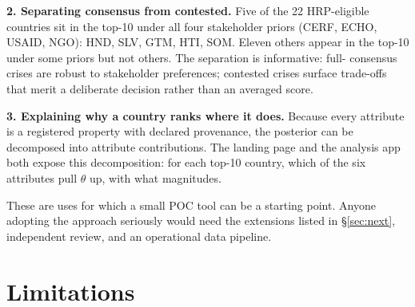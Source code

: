 \documentclass[11pt,a4paper]{article}
\begin{document}
\textbf{2. Separating consensus from contested.} Five of the 22 HRP-eligible
countries sit in the top-10 under all four stakeholder priors (CERF, ECHO,
USAID, NGO): HND, SLV, GTM, HTI, SOM. Eleven others appear in the top-10
under some priors but not others. The separation is informative: full-
consensus crises are robust to stakeholder preferences; contested crises
surface trade-offs that merit a deliberate decision rather than an averaged
score.

\textbf{3. Explaining why a country ranks where it does.} Because every
attribute is a registered property with declared provenance, the posterior
can be decomposed into attribute contributions. The landing page and the
analysis app both expose this decomposition: for each top-10 country, which
of the six attributes pull $\theta$ up, with what magnitudes.

These are uses for which a small POC tool can be a starting point. Anyone
adopting the approach seriously would need the extensions listed in
\S\ref{sec:next}, independent review, and an operational data pipeline.

\section{Limitations}\label{sec:limits}
\end{document}

